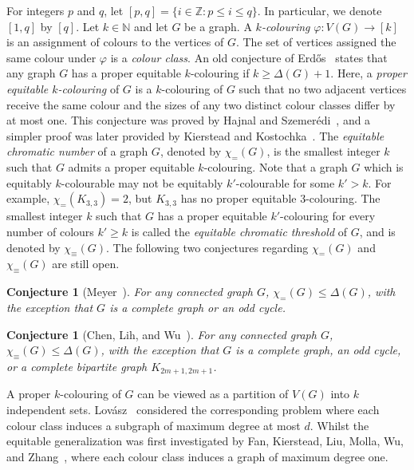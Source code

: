 \documentclass[11pt]{article}
\theoremstyle{plain}
\newtheorem{conj}[thm]{Conjecture}
\numberwithin{equation}{section}
\begin{document}
For integers $p$ and $q$, let  $[p,q] = \{i \in \mathbb{Z} \colon p \le i \le q \}$. In particular, we denote $[1,q]$ by $[q]$. Let $k \in \mathbb{N}$ and let $G$ be a graph. A \emph{$k$-colouring} $\varphi: V(G) \rightarrow [k]$ is an assignment of colours to the vertices of $G$. The set of vertices assigned the same colour under $\varphi$ is a \emph{colour class}.
An old conjecture of Erd\H{o}s~\cite{E1964} states that any graph $G$ has a proper equitable $k$-colouring if $k\ge \Delta(G)+1$. Here, a \emph{proper equitable $k$-colouring} of $G$ is a $k$-colouring of $G$ such that no two adjacent vertices receive the same colour and the sizes of any two distinct colour classes differ by at most one.
This conjecture was proved by Hajnal and Szemer\'{e}di~\cite{HS1970}, and a simpler proof was later provided by Kierstead and Kostochka~\cite{KK2008}.
The \emph{equitable chromatic number} of a graph $G$, denoted by $\chi_{=}(G)$, is the smallest integer $k$ such that $G$ admits a proper equitable $k$-colouring. Note that a graph $G$ which is equitably $k$-colourable may not be equitably $k'$-colourable for some $k'>k$. For example, $\chi_{=}(K_{3,3})=2$, but $K_{3,3}$ has no proper equitable $3$-colouring. The smallest integer $k$ such that $G$ has a proper equitable $k'$-colouring for every number of colours $k'\ge k$ is called the \emph{equitable chromatic threshold} of $G$, and is denoted by $\chi_{\equiv}(G)$.
The following two conjectures regarding  $\chi_{=}(G)$ and $\chi_{\equiv}(G)$ are still open.

\begin{conj}[Meyer~\cite{M1973}]\label{ECC} For any connected graph $G$, $\chi_{=}(G)\leq \Delta (G)$, with the exception that $G$ is a complete graph or an odd cycle.
\end{conj}

\begin{conj}[Chen, Lih, and Wu~\cite{CLW1994}]\label{EDeltaCC} For any connected graph $G$, $\chi_{\equiv}(G)\leq \Delta(G)$, with the exception that $G$ is a complete graph, an odd cycle, or a
	complete bipartite graph $K_{2m+1,2m+1}$.
\end{conj}

A proper $k$-colouring of $G$ can be viewed as a partition of $V(G)$ into $k$ independent sets.
Lov\'asz~\cite{L1966} considered the corresponding problem where each colour class induces a subgraph of maximum degree at most $d$. Whilst the equitable generalization was first investigated by Fan, Kierstead, Liu, Molla, Wu, and Zhang~\cite{FKLMWZ2011}, where each colour class induces a graph of maximum degree one.
\end{document}
